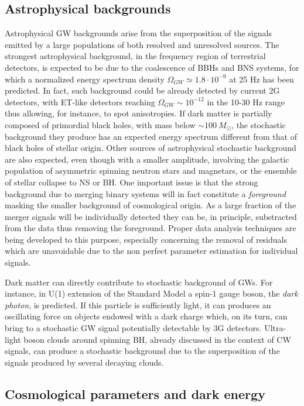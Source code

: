 \subsection{Astrophysical backgrounds} 
Astrophysical GW backgrounds arise from the superposition of the signals emitted by a large populations of both resolved and unresolved sources. The strongest astrophysical background, in the frequency region of terrestrial detectors, is expected to be due to the coalescence of BBHs and BNS systems, for which a normalized energy spectrum density $\Omega_{GW}\simeq 1.8 \cdot 10^{-9}$ at 25 Hz has been predicted. In fact, such background could be already detected by current 2G detectors, with ET-like detectors reaching $\Omega_{GW}\sim 10^{-12}$ in the 10-30 Hz range thus allowing, for instance, to spot anisotropies. If dark matter is partially composed of primordial black holes, with mass below $\sim 100~M_\odot$, the stochastic background they produce has an expected energy spectrum different from that of black holes of stellar origin. 
Other sources of astrophysical stochastic background are also expected, even though with a smaller amplitude, involving the galactic population of asymmetric spinning neutron stars and magnetars, or the ensemble of stellar collapse to NS or BH. One important issue is that the strong background due to merging binary systems will in fact constitute a {\it foreground} masking the smaller background of cosmological origin. As a large fraction of the merger signals will be individually detected they can be, in principle, substracted from the data thus removing the foreground. Proper data analysis techniques are being developed to this purpose, especially concerning the removal of residuals which are unavoidable due to the non perfect parameter estimation for individual signals.       

Dark matter can directly contribute to stochastic background of GWs. For instance, in U(1) extension of 
the Standard Model a spin-1 gauge boson, the {\it dark photon}, is predicted. If this particle is 
sufficiently light, it can produces an oscillating force on objects endowed with a dark charge which, 
on its turn, can bring to a stochastic GW signal potentially detectable by 3G detectors. 
Ultra-light boson clouds around spinning BH, already discussed in the context of CW signals, 
can produce a stochastic background due to the superposition of the signals produced by several 
decaying clouds.

\subsection{Cosmological parameters and dark energy}

